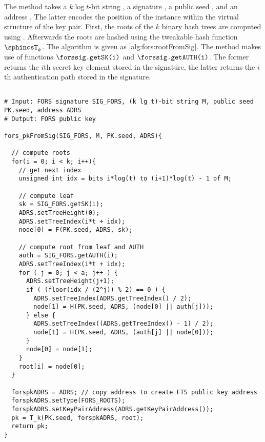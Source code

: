    The method \forspkfromsig takes a $k\log t$-bit string \msg,
   a \fors signature \forssig, a public seed \pseed, and
   an address \adrs. The latter encodes the position of the \fors
   instance within the virtual structure of the \spx key pair.
   First, the roots of the $k$ binary hash trees are computed using
   \forstreehash. Afterwards the roots are hashed using the tweakable hash
   function $\sphincsT_k$.
   The algorithm \forspkfromsig is given
   as \autoref{alg:fors:rootFromSig}. The method \forspkfromsig makes use of
   functions $\forssig\texttt{.getSK(i)}$ and $\forssig\texttt{.getAUTH(i)}$. The
   former returns the $i$th secret key element stored in the
   signature, the latter returns the $i$th authentication path stored in
   the signature.



\begin{lstlisting}[breaklines=true, label=alg:fors:rootFromSig, language=pseudoc,
                   caption=\forspkfromsig\ --
                   Compute a \fors public key from a \fors signature.]

# Input: FORS signature SIG_FORS, (k lg t)-bit string M, public seed PK.seed, address ADRS
# Output: FORS public key

fors_pkFromSig(SIG_FORS, M, PK.seed, ADRS){

  // compute roots
  for(i = 0; i < k; i++){
    // get next index
    unsigned int idx = bits i*log(t) to (i+1)*log(t) - 1 of M;

    // compute leaf
    sk = SIG_FORS.getSK(i);
    ADRS.setTreeHeight(0);
    ADRS.setTreeIndex(i*t + idx);
    node[0] = F(PK.seed, ADRS, sk);

    // compute root from leaf and AUTH
    auth = SIG_FORS.getAUTH(i);
    ADRS.setTreeIndex(i*t + idx);
    for ( j = 0; j < a; j++ ) {
      ADRS.setTreeHeight(j+1);
      if ( (floor(idx / (2^j)) % 2) == 0 ) {
        ADRS.setTreeIndex(ADRS.getTreeIndex() / 2);
        node[1] = H(PK.seed, ADRS, (node[0] || auth[j]));
      } else {
        ADRS.setTreeIndex((ADRS.getTreeIndex() - 1) / 2);
        node[1] = H(PK.seed, ADRS, (auth[j] || node[0]));
      }
      node[0] = node[1];
    }
    root[i] = node[0];
  }

  forspkADRS = ADRS; // copy address to create FTS public key address
  forspkADRS.setType(FORS_ROOTS);
  forspkADRS.setKeyPairAddress(ADRS.getKeyPairAddress());
  pk = T_k(PK.seed, forspkADRS, root);
  return pk;
}
\end{lstlisting}


